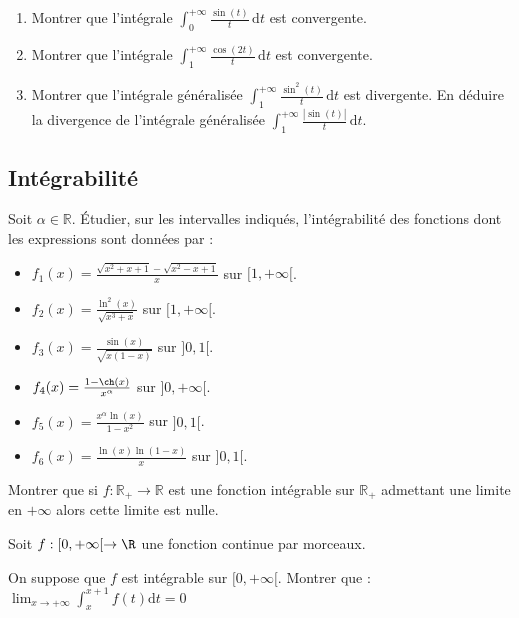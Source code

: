 \documentclass[a4paper,twoside,french,11pt]{VcCours}
\newcommand{\dt}{\text{d}t}
\begin{document}
\begin{Exercice}{} \begin{enumerate}
\item Montrer que l'intégrale $\int_0^{+ \infty} \frac{\sin(t)}{t}\, \dt$ est convergente.
\item Montrer que l'intégrale $\int_1^{+\infty}\frac{\cos(2t)}{t}\, \dt$ est convergente.
\item Montrer que l'intégrale généralisée $\int_1^{+\infty}\frac{\sin^2(t)}{t} \, \dt$ est divergente. En déduire la divergence de l'intégrale généralisée $\int_1^{+\infty}\frac{|\sin(t)|}{t} \, \dt$.
\end{enumerate}
\end{Exercice}


\subsection{Intégrabilité}

\begin{Exercice}{} Soit $\alpha \in \mathbb{R}$. Étudier, sur les intervalles indiqués, l'intégrabilité des fonctions dont les expressions sont données par :
\begin{multicols}{2}
\begin{itemize}
\item $f_1(x)=\frac{\sqrt{x^2+x+1}-\sqrt{x^2-x+1}}{x}$ sur \newline $[1,+\infty[$.
\item $f_2(x)=\frac{\ln^2(x)}{\sqrt{x^3+x}}$ sur $[1,+\infty[$.
\item $f_3(x)=\frac{\sin(x)}{\sqrt{x(1-x)}}$ sur $]0,1[$.
\columnbreak
\item $f_4(x)=\frac{1-\ch(x)}{x^{\alpha}}$ sur $]0,+\infty[$.
\item $f_5(x)=\frac{x^{\alpha}\ln(x)}{1-x^2}$ sur $]0,1[$.
\item $f_6(x)=\frac{\ln(x)\ln(1-x)}{x}$ sur $]0,1[$.
\end{itemize}
\end{multicols}
\end{Exercice}

\begin{Exercice}{} Montrer que si $f : \mathbb{R}_+ \rightarrow \mathbb{R}$ est une fonction intégrable sur $\mathbb{R}_+$ admettant une limite en $+ \infty$ alors cette limite est nulle. 
\end{Exercice} 

\begin{Exercice}{}
  Soit $f :[0, + \infty[ \rightarrow \R$ une fonction continue par morceaux.
  
  On suppose que $f$ est intégrable sur $[0, + \infty[$. Montrer que :
  $\lim_{x \rightarrow + \infty} \int_{x}^{x + 1} f(t) \dt =0$
\end{Exercice}
\end{document}
